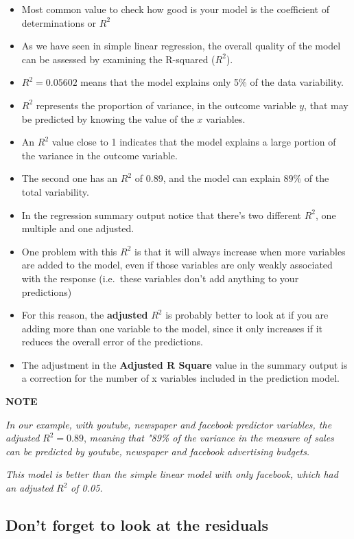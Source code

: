 \documentclass[
]{book}
\begin{document}
\begin{itemize}
\item
  Most common value to check how good is your model is the coefficient of determinations or \(R^2\)
\item
  As we have seen in simple linear regression, the overall quality of the model can be assessed by examining the R-squared (\(R^2\)).
\item
  \(R^2=0.05602\) means that the model explains only 5\% of the data variability.
\item
  \(R^2\) represents the proportion of variance, in the outcome variable \(y\), that may be predicted by knowing the value of the \(x\) variables.
\item
  An \(R^2\) value close to 1 indicates that the model explains a large portion of the variance in the outcome variable.
\item
  The second one has an \(R^2\) of 0.89, and the model can explain \(89\%\) of the total variability.
\item
  In the regression summary output notice that there's two different \(R^2\), one multiple and one adjusted.
\item
  One problem with this \(R^2\) is that it will always increase when more variables are added to the model, even if those variables are only weakly associated with the response (i.e.~these variables don't add anything to your predictions)
\item
  For this reason, the \textbf{adjusted} \(R^2\) is probably better to look at if you are adding more than one variable to the model, since it only increases if it reduces the overall error of the predictions.
\item
  The adjustment in the \textbf{Adjusted R Square} value in the summary output is a correction for the number of x variables included in the prediction model.
\end{itemize}

\textbf{NOTE}

\emph{In our example, with youtube, newspaper and facebook predictor variables, the adjusted} \(R^2 = 0.89\), \emph{meaning that "89\% of the variance in the measure of sales can be predicted by youtube, newspaper and facebook advertising budgets.}

\emph{This model is better than the simple linear model with only facebook, which had an adjusted} \(R^2\) \emph{of 0.05.}

\hypertarget{dont-forget-to-look-at-the-residuals}{%
\subsection{Don't forget to look at the residuals}\label{dont-forget-to-look-at-the-residuals}}
\end{document}
